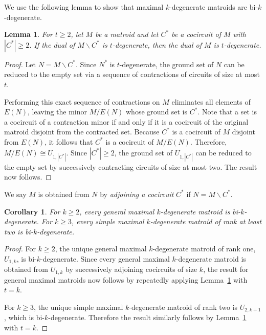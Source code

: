 \documentclass{amsart}
\newcommand{\ba}{\backslash}
\newtheorem{lemma}[theorem]{Lemma}
\newtheorem{corollary}[theorem]{Corollary}
\theoremstyle{definition}
\theoremstyle{remark}
\numberwithin{equation}{section}
\begin{document}
We use the following lemma to show that maximal $k$-degenerate matroids are bi-$k$-degenerate.


\begin{lemma}
\label{adjoin_cocircuits}
For $t \geq 2$, let $M$ be a matroid and let $C^*$ be a cocircuit of $M$ with $|C^*| \ge 2$. If the dual of $M \ba C^*$ is $t$-degenerate, then the dual of $M$ is $t$-degenerate. 
\end{lemma}

\begin{proof}
Let $N = M \ba C^*$. Since $N^*$ is $t$-degenerate, the ground set of $N$ can be reduced to the empty set via a sequence of contractions of circuits of size at most $t$.

Performing this exact sequence of contractions on $M$ eliminates all elements of $E(N)$, leaving the minor $M / E(N)$ whose ground set is $C^*$. Note that a set is a cocircuit of a contraction minor if and only if it is a cocircuit of the original matroid disjoint from the contracted set. Because $C^*$ is a cocircuit of $M$ disjoint from $E(N)$, it follows that $C^*$ is a cocircuit of $M/E(N)$. Therefore, $M / E(N) \cong U_{1, |C^*|}$. Since $|C^*| \ge 2$, the ground set of $U_{1, |C^*|}$ can be reduced to the empty set by successively contracting circuits of size at most two. The result now follows.
\end{proof}


We say $M$ is obtained from $N$ by \textit{adjoining a cocircuit} $C^*$ if $N = M \ba C^*$.

\begin{corollary}
\label{size_bound_bi_k_degenerate}
For $k \geq 2$, every general maximal $k$-degenerate matroid is bi-$k$-degenerate. For $k \geq 3$, every simple maximal $k$-degenerate matroid of rank at least two is bi-$k$-degenerate. 
\end{corollary}

\begin{proof}
For $k \geq 2$, the unique general maximal $k$-degenerate matroid of rank one, $U_{1,k}$, is bi-$k$-degenerate. Since every general maximal $k$-degenerate matroid is obtained from $U_{1,k}$ by successively adjoining cocircuits of size $k$, the result for general maximal matroids now follows by repeatedly applying Lemma~\ref{adjoin_cocircuits} with $t=k$. 

For $k \geq 3$, the unique simple maximal $k$-degenerate matroid of rank two is $U_{2,k+1}$, which is bi-$k$-degenerate. Therefore the result similarly follows by Lemma~\ref{adjoin_cocircuits} with $t=k$.
\end{proof}
\end{document}

